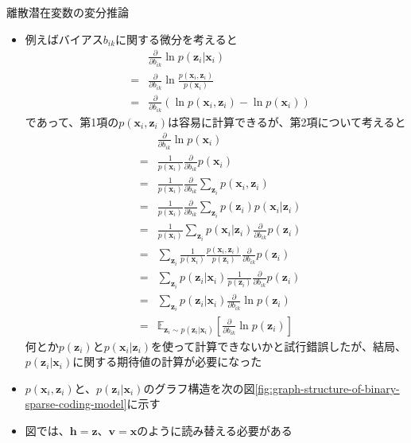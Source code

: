 \documentclass[dvipdfmx,notheorems,t]{beamer}
\begin{document}
\begin{frame}{離散潜在変数の変分推論}
\begin{itemize}
\begin{itemize}
		\item 例えばバイアス$b_{ik}$に関する微分を考えると
		\begin{eqnarray}
			&& \frac{\partial}{\partial b_{ik}} \ln p(\bm{z}_i | \bm{x}_i) \nonumber \\
			&=& \frac{\partial}{\partial b_{ik}} \ln \frac{p(\bm{x}_i, \bm{z}_i)}{p(\bm{x}_i)} \\
			&=& \frac{\partial}{\partial b_{ik}} \left( \ln p(\bm{x}_i, \bm{z}_i) - \ln p(\bm{x}_i) \right)
		\end{eqnarray}
		であって、第1項の$p(\bm{x}_i, \bm{z}_i)$は容易に計算できるが、第2項について考えると
		\begin{eqnarray}
			&& \frac{\partial}{\partial b_{ik}} \ln p(\bm{x}_i) \nonumber \\
			&=& \frac{1}{p(\bm{x}_i)} \frac{\partial}{\partial b_{ik}} p(\bm{x}_i) \\
			&=& \frac{1}{p(\bm{x}_i)} \frac{\partial}{\partial b_{ik}} \sum_{\bm{z}_i} p(\bm{x}_i, \bm{z}_i) \\
			&=& \frac{1}{p(\bm{x}_i)} \frac{\partial}{\partial b_{ik}} \sum_{\bm{z}_i} p(\bm{z}_i) p(\bm{x}_i | \bm{z}_i) \\
			&=& \frac{1}{p(\bm{x}_i)} \sum_{\bm{z}_i} p(\bm{x}_i | \bm{z}_i) \frac{\partial}{\partial b_{ik}} p(\bm{z}_i) \\
			&=& \sum_{\bm{z}_i} \frac{1}{p(\bm{x}_i)} \frac{p(\bm{x}_i, \bm{z}_i)}{p(\bm{z}_i)} \frac{\partial}{\partial b_{ik}} p(\bm{z}_i) \\
			&=& \sum_{\bm{z}_i} p(\bm{z}_i | \bm{x}_i) \frac{1}{p(\bm{z}_i)} \frac{\partial}{\partial b_{ik}} p(\bm{z}_i) \\
			&=& \sum_{\bm{z}_i} p(\bm{z}_i | \bm{x}_i) \frac{\partial}{\partial b_{ik}} \ln p(\bm{z}_i) \\
			&=& \mathbb{E}_{\bm{z}_i \sim p(\bm{z}_i | \bm{x}_i)} \left[ \frac{\partial}{\partial b_{ik}} \ln p(\bm{z}_i) \right]
		\end{eqnarray}
		何とか$p(\bm{z}_i)$と$p(\bm{x}_i | \bm{z}_i)$を使って計算できないかと試行錯誤したが、結局、\color{red}$p(\bm{z}_i | \bm{x}_i)$に関する期待値の計算が必要\normalcolor になった
		\newline
		
		\item $p(\bm{x}_i, \bm{z}_i)$と、$p(\bm{z}_i | \bm{x}_i)$のグラフ構造を次の図\ref{fig:graph-structure-of-binary-sparse-coding-model}に示す
		\item 図では、$\bm{h} = \bm{z}$、$\bm{v} = \bm{x}$のように読み替える必要がある
	\end{itemize}
\end{itemize}

\end{frame}
\end{document}
